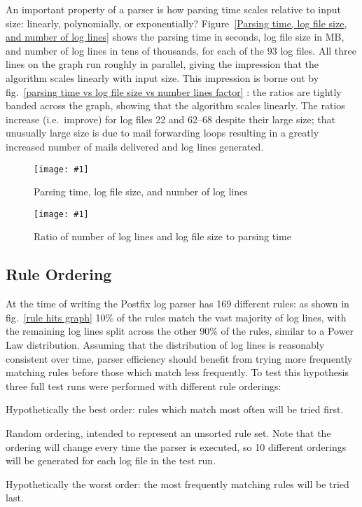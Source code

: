 \documentclass{svmult}
\newcommand{\showgraph}[3]{%
    \begin{figure}[btp]%
        \texttt{[image: \#1]}%
        \caption{#2}\label{#3}%
    \end{figure}%
}
\newcommand{\refwithlabel}[2]{%
    #1~\vref{#2}%
}
\newcommand{\graphref}[1]{%
    \refwithlabel{fig.}{#1}%
}
\newcommand{\Graphref}[1]{%
    \refwithlabel{Figure}{#1}%
}
\newcommand{\numberOFlogFILES}[0]{%
    93%
}
\newcommand{\numberOFrules}[0]{%
    169%
}
\begin{document}
An important property of a parser is how parsing time scales relative to
input size: linearly, polynomially, or exponentially?  \Graphref{Parsing
time, log file size, and number of log lines} shows the parsing time in
seconds, log file size in MB, and number of log lines in tens of thousands,
for each of the \numberOFlogFILES{} log files.  All three lines on the
graph run roughly in parallel, giving the impression that the algorithm
scales linearly with input size.  This impression is borne out by
\graphref{parsing time vs log file size vs number lines factor}: the ratios
are tightly banded across the graph, showing that the algorithm scales
linearly.  The ratios increase (i.e.\ improve) for log files 22 and 62--68
despite their large size; that unusually large size is due to mail
forwarding loops resulting in a greatly increased number of mails delivered
and log lines generated.

\showgraph{build/graph-input-size-vs-parsing-time}{Parsing time, log file size,
and number of log lines}{Parsing time, log file size, and number of log lines}
\showgraph{build/graph-input-size-vs-parsing-time-ratio}{Ratio of number of
log lines and log file size to parsing time}{parsing time vs log file size vs
number lines factor}

\subsection{Rule Ordering}

\label{Rule ordering}

At the time of writing the Postfix log parser has \numberOFrules{}
different rules: as shown in \graphref{rule hits graph} 10\% of the rules
match the vast majority of log lines, with the remaining log lines split
across the other 90\% of the rules, similar to a Power Law distribution.
Assuming that the distribution of log lines is reasonably consistent over
time, parser efficiency should benefit from trying more frequently matching
rules before those which match less frequently.  To test this hypothesis
three full test runs were performed with different rule orderings:

\begin{description}[shuffled]

    \item [optimal]  Hypothetically the best order: rules which match most
        often will be tried first.

    \item [shuffled] Random ordering, intended to represent an unsorted rule
        set.  Note that the ordering will change every time the parser is
        executed, so 10 different orderings will be generated for each log
        file in the test run.

    \item [reverse] Hypothetically the worst order: the most frequently
        matching rules will be tried last.

\end{description}
\end{document}
